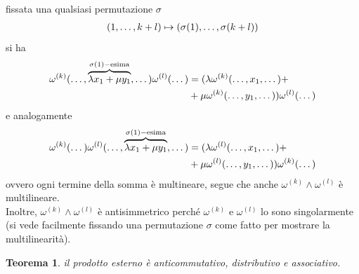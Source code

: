 \documentclass[twoside, 11pt]{amsbook}
\makeatletter
\newcommand{\0}{{(0)}}
\newcommand{\3}{{(3)}}
\theoremstyle{colonplain}
\newtheorem{thm}{Teorema}[chapter]
\theoremstyle{colondefinition}
\theoremstyle{colonremark}
\numberwithin{equation}{chapter}
\renewcommand{\proofname}{Dimostrazione}
\renewenvironment{proof}[1][\proofname]{\par
  \pushQED{\qed}%
  \normalfont \topsep6\p@\@plus6\p@\relax
  \trivlist
  \item[\hskip\labelsep\bfseries #1:]\ignorespaces
}{%
  \popQED\endtrivlist\@endpefalse
}
\makeatother
\begin{document}
\begin{proof} fissata una qualsiasi permutazione $\sigma$
\begin{align}
    (1, \dots, k + l) \mapsto (\sigma(1), \dots, \sigma(k + l)) \notag
\end{align}
si ha
\begin{align}
    \omega^{(k)}(\dots, \overbrace{\lambda x_1 + \mu y_1}^{\sigma(1)-\text{esima}}, \dots)\omega^{(l)}(\dots) &= (\lambda\omega^{(k)}(\dots, x_1, \dots) + \notag \\
    &+ \mu\omega^{(k)}(\dots, y_1, \dots))\omega^{(l)}(\dots) \notag
\end{align}
e analogamente 
\begin{align}
    \omega^{(k)}(\dots)\omega^{(l)}(\dots, \overbrace{\lambda x_1 + \mu y_1}^{\sigma(1)-\text{esima}}, \dots) &= (\lambda\omega^{(l)}(\dots, x_1, \dots) + \notag \\
    &+ \mu\omega^{(l)}(\dots, y_1, \dots))\omega^{(k)}(\dots) \notag
\end{align}
ovvero ogni termine della somma è multineare, segue che anche $\omega^{(k)} \wedge \omega^{(l)}$ è multilineare. \\
Inoltre, $\omega^{(k)} \wedge \omega^{(l)}$ è antisimmetrico perché $\omega^{(k)}$ e $\omega^{(l)}$ lo sono singolarmente (si vede facilmente fissando una permutazione $\sigma$ come fatto per mostrare la multilinearità).
\end{proof}
\begin{thm} il prodotto esterno è anticommutativo, distributivo e associativo.
\end{thm}
\end{document}
